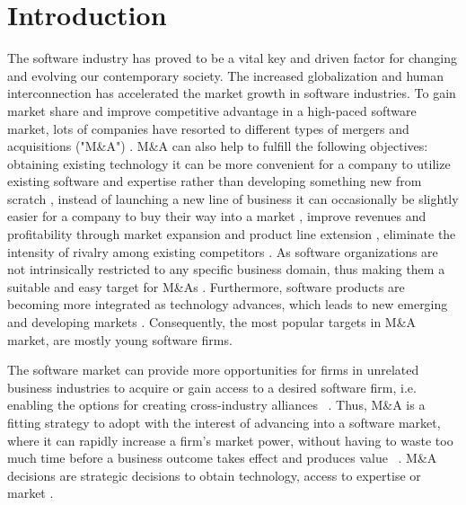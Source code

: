 \documentclass[preprint,10pt]{elsarticle}
\begin{document}

\section{Introduction}\label{Intro}


The software industry has proved to be a vital key and driven factor for changing and evolving our contemporary society. The increased globalization and human interconnection \cite{Pezzi} has accelerated the market growth in software industries. To gain market share and improve competitive advantage in a high-paced software market, lots of companies have resorted to different types of mergers and acquisitions  ("M\&A") \cite{McCarthy}. M\&A can also help to fulfill the following objectives: obtaining existing technology it can be more convenient for a company to utilize existing software and expertise rather than developing something new from scratch \cite{Leger}, instead of launching a new line of business it can occasionally be slightly easier for a company to buy their way into a market \cite{Silva}, improve revenues and profitability through market expansion and product line extension \cite{RAHMAN201524}, eliminate the intensity of rivalry among existing competitors  \cite{Cefis}. As software organizations are not intrinsically restricted to any specific business domain, thus making them a suitable and easy target for M\&As \cite{Pezzi}. Furthermore, software products are becoming more integrated as technology advances, which leads to new emerging and developing markets \cite{chalencon2018cross}. Consequently, the most popular targets in M\&A market, are mostly young software firms.


The software market can provide more opportunities for firms in unrelated business industries to acquire or gain access to a desired software firm, i.e. enabling the options for creating cross-industry alliances ~\cite{Pezzi}. Thus, M\&A is a fitting strategy to adopt with the interest of advancing into a software market, where it can rapidly increase a firm's market power, without having to waste too much time before a business outcome takes effect and produces value ~\cite{schief2012business}. M\&A decisions are strategic decisions to obtain technology, access to expertise or market \cite{AURUM2003945}.
\end{document}
